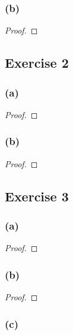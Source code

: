 \documentclass[14pt]{extarticle}
\begin{document}
\subsubsection{(b)}

\begin{proof}

\end{proof}

\subsection{Exercise 2}

\subsubsection{(a)}

\begin{proof}

\end{proof}

\subsubsection{(b)}

\begin{proof}

\end{proof}

\subsection{Exercise 3}

\subsubsection{(a)}

\begin{proof}

\end{proof}

\subsubsection{(b)}

\begin{proof}

\end{proof}

\subsubsection{(c)}
\end{document}
